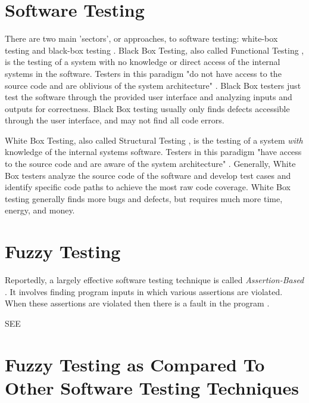 \documentclass[10pt, final, journal, letterpaper, twoside, twocolumn]{IEEEtran}
\begin{document}
\section{Software Testing}
	There are two main 'sectors', or approaches, to software testing: white-box testing and black-box testing \cite{boxes}. Black Box Testing, also called Functional Testing \cite{slide-testing}, is the testing of a system with no knowledge or direct access of the internal systems in the software. Testers in this paradigm "do not have access to the source code and are oblivious of the system architecture" \cite{boxes}. Black Box testers just test the software through the provided user interface and analyzing inputs and outputs for correctness. Black Box testing usually only finds defects accessible through the user interface, and may not find all code errors.
	
	White Box Testing, also called Structural Testing \cite{slide-testing}, is the testing of a system \textit{with} knowledge of the internal systems software. Testers in this paradigm "have access to the source code and are aware of the system architecture" \cite{boxes}. Generally, White Box testers analyze the source code of the software and develop test cases and identify specific code paths to achieve the most raw code coverage. White Box testing generally finds more bugs and defects, but requires much more time, energy, and money.


\section{Fuzzy Testing}
	Reportedly, a largely effective software testing technique is called \textit{Assertion-Based} \cite{assertion}. It involves finding program inputs in which various assertions are violated. When these assertions are violated then there is a fault in the program \cite{assertion}.
	
	
	SEE \cite{break-software}
	
	
		
	

\section{Fuzzy Testing as Compared To Other Software Testing Techniques}
	
\end{document}
